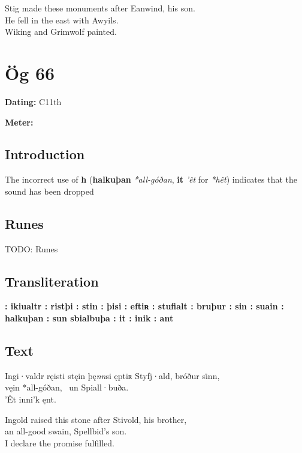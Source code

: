 \bpb Stig made these monuments after Eanwind, his son. \\
He fell in the east with Awyils. \\
Wiking and Grimwolf painted.\epb\epg

\sectionline\clearpage


\section{Ög 66}

\begin{flushright}%
\textbf{Dating:} C11th

\textbf{Meter:} \Fornyrdislag
\end{flushright}%

\subsection{Introduction}

The incorrect use of \textbf{h} (\textbf{halkuþan} \emph{*all-góðan}, \textbf{it} \emph{’êt} for \emph{*hêt}) indicates that the sound has been dropped

\subsection{Runes}

TODO: Runes%

\subsection{Transliteration}

\textbf{: ikiualtr : ristþi : stin : þisi : eftiʀ : stufialt : bruþur : sin : suain : halkuþan : sun sbialbuþa : it : inik : ant}

\subsection{Text}

\bpg\bpa[0]%
\startsub Ingi·valdr ręisti stęin þę\emph{nn}si ęptiʀ Styfj·ald, bróður si̇nn,\endsub \\
vęin *all-góðan, \hld\ un Spiall·buða. \\
’Êt inni’k ęnt.\epa

\bpb Ingold raised this stone after Stivold, his brother, \\
an all-good swain, Spellbid’s son. \\
I declare the promise fulfilled.\epb\epg

